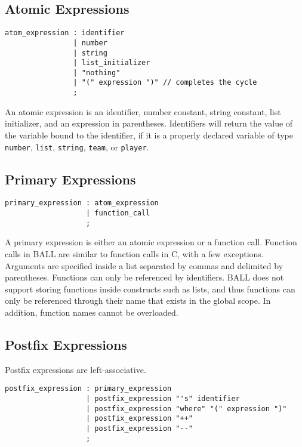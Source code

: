 \subsection{Atomic Expressions}
\begin{verbatim}
atom_expression : identifier
                | number
                | string
                | list_initializer
                | "nothing"
                | "(" expression ")" // completes the cycle
                ;
\end{verbatim} 

An atomic expression is an identifier, number constant, string
constant, list initializer, and an expression in
parentheses. Identifiers will return the value of the variable bound
to the identifier, if it is a properly declared variable of type
\texttt{number}, \texttt{list}, \texttt{string}, \texttt{team}, or
\texttt{player}.

\subsection{Primary Expressions}
\begin{verbatim}
primary_expression : atom_expression
                   | function_call
                   ;
\end{verbatim} 
A primary expression is either an atomic expression or a function
call. Function calls in BALL are similar to function calls in C, with
a few exceptions.  Arguments are specified inside a list separated by
commas and delimited by parentheses.  Functions can only be referenced
by identifiers. BALL does not support storing functions inside
constructs such as lists, and thus functions can only be referenced
through their name that exists in the global scope. In addition,
function names cannot be overloaded.

\subsection{Postfix Expressions}
Postfix expressions are left-associative.
\begin{verbatim}
postfix_expression : primary_expression
                   | postfix_expression "'s" identifier
                   | postfix_expression "where" "(" expression ")"
                   | postfix_expression "++"
                   | postfix_expression "--"
                   ;
\end{verbatim}

